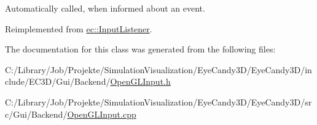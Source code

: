 Automatically called, when informed about an event. 



Reimplemented from \mbox{\hyperlink{classec_1_1_input_listener_a9ceaefc79c6b0b260e88454616137840}{ec\+::\+Input\+Listener}}.



The documentation for this class was generated from the following files\+:\begin{DoxyCompactItemize}
\item 
C\+:/\+Library/\+Job/\+Projekte/\+Simulation\+Visualization/\+Eye\+Candy3\+D/\+Eye\+Candy3\+D/include/\+E\+C3\+D/\+Gui/\+Backend/\mbox{\hyperlink{_open_g_l_input_8h}{Open\+G\+L\+Input.\+h}}\item 
C\+:/\+Library/\+Job/\+Projekte/\+Simulation\+Visualization/\+Eye\+Candy3\+D/\+Eye\+Candy3\+D/src/\+Gui/\+Backend/\mbox{\hyperlink{_open_g_l_input_8cpp}{Open\+G\+L\+Input.\+cpp}}\end{DoxyCompactItemize}
